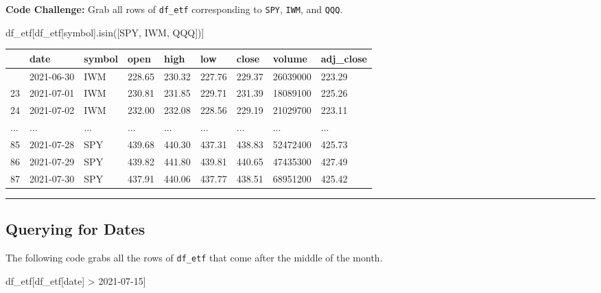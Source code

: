 \documentclass[
  letterpaper,
  DIV=11,
  numbers=noendperiod]{scrreprt}
\newenvironment{Shaded}{\begin{snugshade}}{\end{snugshade}}
\newcommand{\NormalTok}[1]{\textcolor[rgb]{0.00,0.23,0.31}{#1}}
\newcommand{\OperatorTok}[1]{\textcolor[rgb]{0.37,0.37,0.37}{#1}}
\newcommand{\StringTok}[1]{\textcolor[rgb]{0.13,0.47,0.30}{#1}}
\begin{document}
\textbf{Code Challenge:} Grab all rows of \texttt{df\_etf} corresponding
to \texttt{SPY}, \texttt{IWM}, and \texttt{QQQ}.

\begin{Shaded}
\begin{Highlighting}[]
\NormalTok{df\_etf[df\_etf[}\StringTok{\textquotesingle{}symbol\textquotesingle{}}\NormalTok{].isin([}\StringTok{\textquotesingle{}SPY\textquotesingle{}}\NormalTok{, }\StringTok{\textquotesingle{}IWM\textquotesingle{}}\NormalTok{, }\StringTok{\textquotesingle{}QQQ\textquotesingle{}}\NormalTok{])]}
\end{Highlighting}
\end{Shaded}

\begin{longtable}[]{@{}lllllllll@{}}
\toprule\noalign{}
& date & symbol & open & high & low & close & volume & adj\_close \\
\midrule\noalign{}
\endhead
\bottomrule\noalign{}
\endlastfoot
22 & 2021-06-30 & IWM & 228.65 & 230.32 & 227.76 & 229.37 & 26039000 &
223.29 \\
23 & 2021-07-01 & IWM & 230.81 & 231.85 & 229.71 & 231.39 & 18089100 &
225.26 \\
24 & 2021-07-02 & IWM & 232.00 & 232.08 & 228.56 & 229.19 & 21029700 &
223.11 \\
... & ... & ... & ... & ... & ... & ... & ... & ... \\
85 & 2021-07-28 & SPY & 439.68 & 440.30 & 437.31 & 438.83 & 52472400 &
425.73 \\
86 & 2021-07-29 & SPY & 439.82 & 441.80 & 439.81 & 440.65 & 47435300 &
427.49 \\
87 & 2021-07-30 & SPY & 437.91 & 440.06 & 437.77 & 438.51 & 68951200 &
425.42 \\
\end{longtable}

\begin{center}\rule{0.5\linewidth}{0.5pt}\end{center}

\hypertarget{querying-for-dates}{%
\subsection{Querying for Dates}\label{querying-for-dates}}

The following code grabs all the rows of \texttt{df\_etf} that come
after the middle of the month.

\begin{Shaded}
\begin{Highlighting}[]
\NormalTok{df\_etf[df\_etf[}\StringTok{\textquotesingle{}date\textquotesingle{}}\NormalTok{] }\OperatorTok{\textgreater{}} \StringTok{\textquotesingle{}2021{-}07{-}15\textquotesingle{}}\NormalTok{]}
\end{Highlighting}
\end{Shaded}
\end{document}
